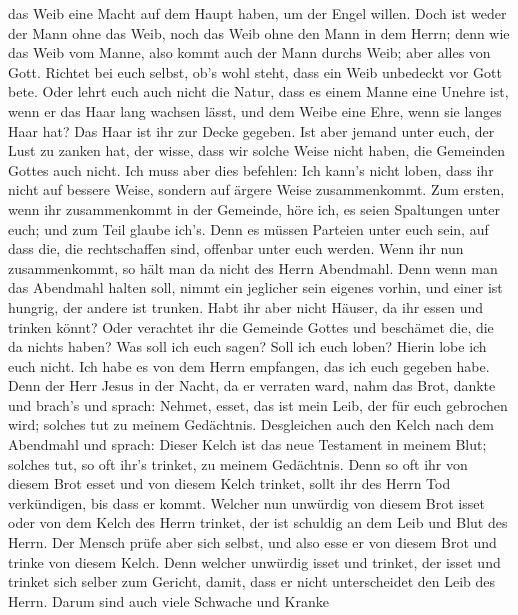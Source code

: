 das Weib eine Macht auf dem Haupt haben, um der Engel willen.
 Doch ist weder der Mann ohne das Weib, noch das Weib ohne
den Mann in dem Herrn;  denn wie das Weib vom Manne, also
kommt auch der Mann durchs Weib; aber alles von Gott. 
Richtet bei euch selbst, ob's wohl steht, dass ein Weib unbedeckt vor
Gott bete.  Oder lehrt euch auch nicht die Natur, dass es
einem Manne eine Unehre ist, wenn er das Haar lang wachsen lässt,
 und dem Weibe eine Ehre, wenn sie langes Haar hat? Das
Haar ist ihr zur Decke gegeben.  Ist aber jemand unter
euch, der Lust zu zanken hat, der wisse, dass wir solche Weise nicht
haben, die Gemeinden Gottes auch nicht.  Ich muss aber dies
befehlen: Ich kann's nicht loben, dass ihr nicht auf bessere Weise,
sondern auf ärgere Weise zusammenkommt.  Zum ersten, wenn
ihr zusammenkommt in der Gemeinde, höre ich, es seien Spaltungen unter
euch; und zum Teil glaube ich's.  Denn es müssen Parteien
unter euch sein, auf dass die, die rechtschaffen sind, offenbar unter
euch werden.  Wenn ihr nun zusammenkommt, so hält man da
nicht des Herrn Abendmahl.  Denn wenn man das Abendmahl
halten soll, nimmt ein jeglicher sein eigenes vorhin, und einer ist
hungrig, der andere ist trunken.  Habt ihr aber nicht
Häuser, da ihr essen und trinken könnt? Oder verachtet ihr die Gemeinde
Gottes und beschämet die, die da nichts haben? Was soll ich euch sagen?
Soll ich euch loben? Hierin lobe ich euch nicht.  Ich habe
es von dem Herrn empfangen, das ich euch gegeben habe. Denn der Herr
Jesus in der Nacht, da er verraten ward, nahm das Brot, 
dankte und brach's und sprach: Nehmet, esset, das ist mein Leib, der für
euch gebrochen wird; solches tut zu meinem Gedächtnis. 
Desgleichen auch den Kelch nach dem Abendmahl und sprach: Dieser Kelch
ist das neue Testament in meinem Blut; solches tut, so oft ihr's
trinket, zu meinem Gedächtnis.  Denn so oft ihr von diesem
Brot esset und von diesem Kelch trinket, sollt ihr des Herrn Tod
verkündigen, bis dass er kommt.  Welcher nun unwürdig von
diesem Brot isset oder von dem Kelch des Herrn trinket, der ist schuldig
an dem Leib und Blut des Herrn.  Der Mensch prüfe aber sich
selbst, und also esse er von diesem Brot und trinke von diesem Kelch.
 Denn welcher unwürdig isset und trinket, der isset und
trinket sich selber zum Gericht, damit, dass er nicht unterscheidet den
Leib des Herrn.  Darum sind auch viele Schwache und Kranke
